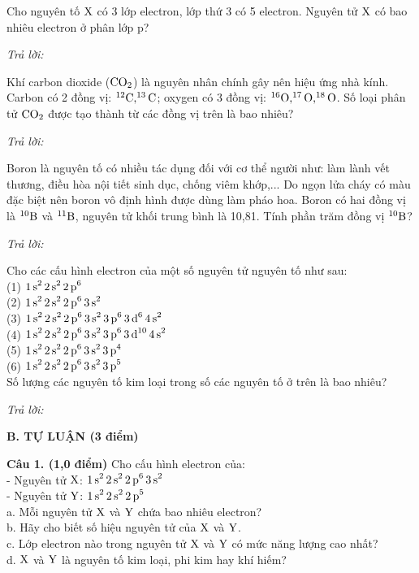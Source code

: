 \documentclass[11pt,a4paper]{article}
\begin{document}
\begin{ex}
Cho nguyên tố $\ce{X}$ có 3 lớp electron, lớp thứ 3 có 5 electron. Nguyên tử $\ce{X}$ có bao nhiêu electron ở phân lớp p?

\noindent\textit{Trả lời:} \dotfill
\end{ex}
\begin{ex}
Khí carbon dioxide ($\ce{CO2}$) là nguyên nhân chính gây nên hiệu ứng nhà kính. Carbon có 2 đồng vị: $^{12}\ce{C}, ^{13}\ce{C}$; oxygen có 3 đồng vị: $^{16}\ce{O}, ^{17}\ce{O}, ^{18}\ce{O}$. Số loại phân tử $\ce{CO2}$ được tạo thành từ các đồng vị trên là bao nhiêu?

\noindent\textit{Trả lời:} \dotfill
\end{ex}
\begin{ex}
Boron là nguyên tố có nhiều tác dụng đối với cơ thể người như: làm lành vết thương, điều hòa nội tiết sinh dục, chống viêm khớp,... Do ngọn lửa cháy có màu đặc biệt nên boron vô định hình được dùng làm pháo hoa. Boron có hai đồng vị là $^{10}\ce{B}$ và $^{11}\ce{B}$, nguyên tử khối trung bình là 10,81. Tính phần trăm đồng vị $^{10}\ce{B}$?

\noindent\textit{Trả lời:} \dotfill
\end{ex}
\begin{ex}
Cho các cấu hình electron của một số nguyên tử nguyên tố như sau:\\
(1) $\ce{1s^2 2s^2 2p^6}$\\
(2) $\ce{1s^2 2s^2 2p^6 3s^2}$\\
(3) $\ce{1s^2 2s^2 2p^6 3s^2 3p^6 3d^6 4s^2}$\\
(4) $\ce{1s^2 2s^2 2p^6 3s^2 3p^6 3d^{10} 4s^2}$\\
(5) $\ce{1s^2 2s^2 2p^6 3s^2 3p^4}$\\
(6) $\ce{1s^2 2s^2 2p^6 3s^2 3p^5}$\\
Số lượng các nguyên tố kim loại trong số các nguyên tố ở trên là bao nhiêu?

\noindent\textit{Trả lời:} \dotfill
\end{ex}
\vspace{6pt}
\noindent
{\color{mainGreen}\textbf{\Large B. TỰ LUẬN (3 điểm)}}
\vspace{2pt}

\noindent
\textbf{Câu 1. (1,0 điểm)} Cho cấu hình electron của:\\
- Nguyên tử $\ce{X}$: $\ce{1s^2 2s^2 2p^6 3s^2}$\\
- Nguyên tử $\ce{Y}$: $\ce{1s^2 2s^2 2p^5}$\\
a. Mỗi nguyên tử $\ce{X}$ và $\ce{Y}$ chứa bao nhiêu electron?\\
b. Hãy cho biết số hiệu nguyên tử của $\ce{X}$ và $\ce{Y}$.\\
c. Lớp electron nào trong nguyên tử $\ce{X}$ và $\ce{Y}$ có mức năng lượng cao nhất?\\
d. $\ce{X}$ và $\ce{Y}$ là nguyên tố kim loại, phi kim hay khí hiếm?
\end{document}
